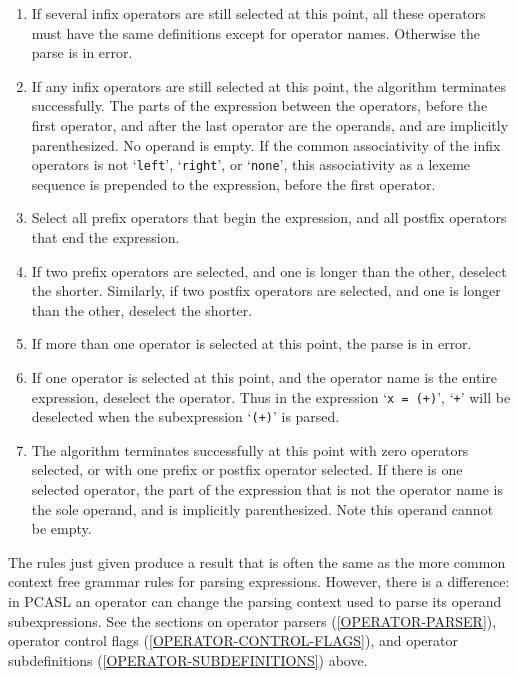 \documentclass[12pt]{article}
\begin{document}
\begin{enumerate}
\item
If several infix operators are still selected at this point, all these
operators must have the same definitions except for operator names.
Otherwise the parse is in error.

\item
If any infix operators are still selected at this point, the algorithm
terminates successfully.
The parts of the expression between the operators, before the first
operator, and after the last operator are the operands, and are
implicitly parenthesized.  No operand is empty.
If the common associativity of the infix operators is not
`\verb|left|',
`\verb|right|', or
`\verb|none|', this associativity as a lexeme sequence is prepended to the
expression, before the first operator.

\item
Select all prefix operators that begin the expression, and all postfix
operators that end the expression.

\item
If two prefix operators are selected, and one is longer than the other,
deselect the shorter.
Similarly, if two postfix operators are selected,
and one is longer than the other,
deselect the shorter.

\item
If more than one operator is selected at this point, the parse is in error.

\item
If one operator is selected at this point, and the operator name
is the entire expression, deselect the operator.  Thus
in the expression `\verb|x = (+)|', `\verb|+|' will be deselected
when the subexpression `\verb|(+)|' is parsed.

\item
The algorithm terminates successfully
at this point with zero operators selected,
or with one prefix or postfix operator selected.
If there is one selected operator, the part of the expression
that is not the operator name is the sole operand, and is implicitly
parenthesized.  Note this operand cannot be empty.

\end{enumerate}


The rules just given produce a result that is often the same as the
more common context free grammar rules for parsing expressions.  However,
there is a difference: in PCASL an operator can change the parsing context
used to parse its operand subexpressions.  See the sections on
operator parsers (\ref{OPERATOR-PARSER}),
operator control flags (\ref{OPERATOR-CONTROL-FLAGS}),
and operator subdefinitions (\ref{OPERATOR-SUBDEFINITIONS})
above.
\end{document}
